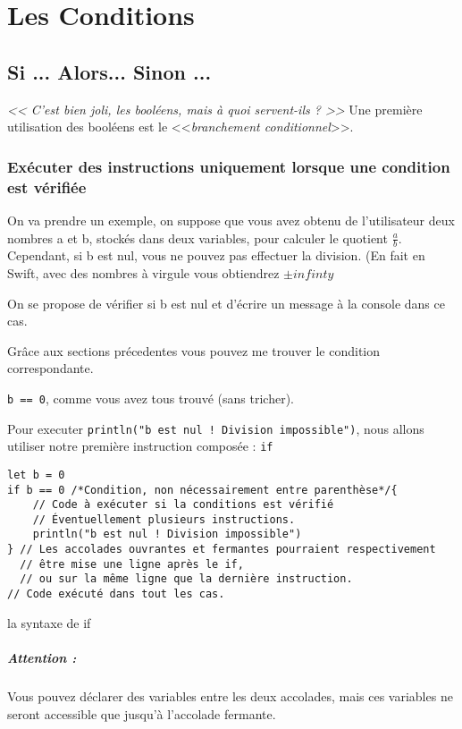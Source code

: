 \chapter{Les Conditions}
\section{Si ... Alors... Sinon ...}
\emph{<< C'est bien joli, les booléens, mais à quoi servent-ils ? >>}
Une première utilisation des booléens est le <<\emph{branchement conditionnel}>>.
\subsection{Exécuter des instructions uniquement lorsque une condition est vérifiée}
On va prendre un exemple, on suppose que vous avez obtenu de l'utilisateur deux nombres a et b, stockés dans deux variables, pour calculer le quotient $\frac{a}{b}$.
Cependant, si b est nul, vous ne pouvez pas effectuer la division. (En fait en Swift, avec des nombres à virgule vous obtiendrez $\pm infinty$

On se propose de vérifier si b est nul et d'écrire un message à la console dans ce cas.

Grâce aux sections précedentes vous pouvez me trouver le condition correspondante.

\pagebreak %
\texttt{b == 0}, comme vous avez tous trouvé (sans tricher).

Pour executer \texttt{println("b est nul ! Division impossible")}, nous allons utiliser notre première instruction composée : \texttt{if}

\begin{listing}[h]
\begin{verbatim}
let b = 0
if b == 0 /*Condition, non nécessairement entre parenthèse*/{
    // Code à exécuter si la conditions est vérifié
    // Éventuellement plusieurs instructions.
    println("b est nul ! Division impossible")
} // Les accolades ouvrantes et fermantes pourraient respectivement
  // être mise une ligne après le if,
  // ou sur la même ligne que la dernière instruction.
// Code exécuté dans tout les cas.
\end{verbatim}
\caption{la syntaxe de if}
\end{listing}
\paragraph{Attention :}
Vous pouvez déclarer des variables entre les deux accolades, mais ces variables ne seront accessible que jusqu'à l'accolade fermante.
